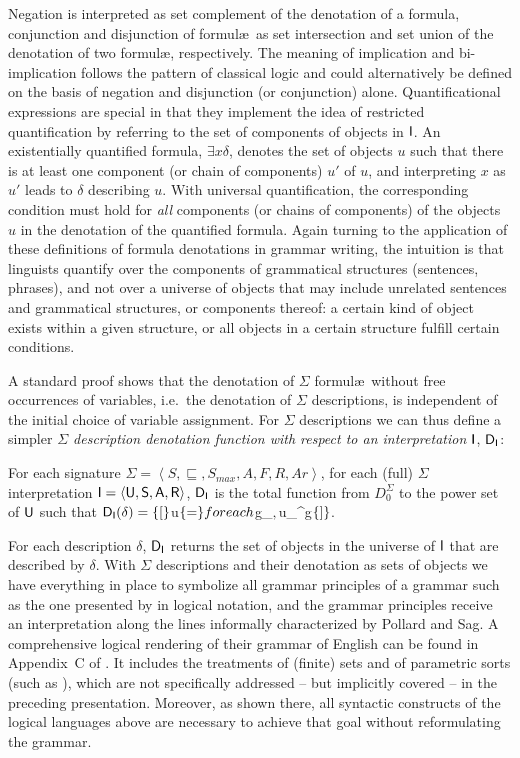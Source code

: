 \documentclass[output=paper
                ,modfonts
                ,nonflat
	        ,collection
	        ,collectionchapter
	        ,collectiontoclongg
 	        ,biblatex
                ,babelshorthands
                ,newtxmath
                ,draftmode
                ,colorlinks, citecolor=brown
]{./langsci/langscibook}
\begin{document}
{{Negation is interpreted as set complement of the denotation of a
formula, conjunction and disjunction of formul\ae\ as set intersection
and set union of the denotation of two formul\ae, respectively. The
meaning of implication and bi-implication follows the pattern of
classical logic and could alternatively be defined on the basis of
negation and disjunction (or conjunction) alone. Quantificational
expressions are special in that they implement the idea of restricted
quantification by referring to the set of components of objects in
$\mathsf{I}$.  An existentially quantified formula, $\exists x\delta$,
denotes the set of objects $u$ such that there is at least one
component (or chain of components) $u'$ of $u$, and interpreting $x$
as $u'$ leads to $\delta$ describing $u$.  With universal
quantification, the corresponding condition must hold for \emph{all}
components (or chains of components) of the objects $u$ in the denotation
of the quantified formula. Again turning to the
application of these definitions of formula denotations in grammar
writing, the intuition is that linguists quantify over the components
of grammatical structures (sentences, phrases), and not over a
universe of objects that may include unrelated sentences and
grammatical structures, or components thereof: a certain kind of
object exists within a given structure, or all objects in a certain
structure fulfill certain conditions.


A standard proof shows that the denotation of $\Sigma$ formul\ae\
without free occurrences of variables, i.e.\ the denotation of
$\Sigma$ descriptions, is independent of the initial choice of
variable assignment. For $\Sigma$ descriptions we can thus define a
simpler \emph{$\Sigma$ description denotation function with respect to
  an interpretation $\mathsf{I}$}, $\mathsf{D}_{\mathsf{I}}$:

\begin{mydef}
For each signature $\Sigma=\left<S,\sqsubseteq,S_{max},A,F,R,Ar\right>$,
for each (full) $\Sigma$ interpretation $\mathsf{I}=\langle\mathsf{U},\mathsf{S},\mathsf{A},\mathsf{R}\rangle$,
$\mathsf{D}_{\mathsf{I}}$ is the total function from $D_0^{\Sigma}$ to the power
set of $\mathsf{U}$ such that
$\mathsf{D}_{\mathsf{I}}(\delta)=
\{{[}\}$u\in\Unive$
  \{{=}\} for each $g\in\VarInt_{\Inte}$, $u\in\Dinte_{\Inte}^g$
\{{]}\}$.
\end{mydef}

For each description $\delta$, $\mathsf{D}_{\mathsf{I}}$ returns the set of
objects in the universe of $\mathsf{I}$ that are described by
$\delta$. With $\Sigma$ descriptions and their denotation as sets of
objects we have everything in place to symbolize all grammar
principles of a grammar such as the one presented by
\citet{PollardSag1994} in logical notation, and the grammar principles
receive an interpretation along the lines
informally characterized by Pollard and Sag. A comprehensive logical
rendering of their grammar of English can be found in Appendix~C of
\citet{Richter2004a-u}. It includes the treatments of (finite) sets
and of parametric sorts (such as \type{list(synsem)}), which are not
specifically addressed -- but implicitly covered -- in
the preceding presentation. Moreover, as shown there, all syntactic
constructs of the logical languages above are necessary to achieve
that goal without reformulating the grammar.



}}
\end{document}
